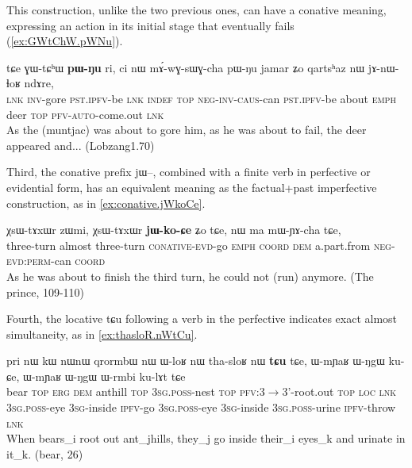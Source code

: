 \documentclass[oldfontcommands,oneside,a4paper,11pt]{article}
\newcommand{\ipa}[1]{{\phon \mbox{#1}}} %
\begin{document}
This construction, unlike the two previous ones, can have a conative meaning, expressing an action in its initial stage that eventually fails (\ref{ex:GWtChW.pWNu}).

     \begin{exe}
\ex \label{ex:GWtChW.pWNu}
\gll
\ipa{tɕe}  	\ipa{ɣɯ-tɕʰɯ}  	\ipa{\textbf{pɯ-ŋu}}  	\ipa{ri,}  	\ipa{ci}  	\ipa{nɯ}  	\ipa{mɤ́-wɣ-sɯɣ-cha}  	\ipa{pɯ-ŋu}  	\ipa{jamar}  	\ipa{ʑo}  	\ipa{qartsʰaz}  	\ipa{nɯ}  	\ipa{jɤ-nɯ-ɬoʁ}  	\ipa{ndɤre,}  \\
\textsc{lnk} \textsc{inv}-gore \textsc{pst.ipfv}-be \textsc{lnk} \textsc{indef} \textsc{top} \textsc{neg-inv-caus}-can  \textsc{pst.ipfv}-be about \textsc{emph} deer \textsc{top} \textsc{pfv-auto}-come.out \textsc{lnk} \\
\glt As the (muntjac) was about to gore him, as he was about to fail, the deer appeared and... (Lobzang1.70)
 \end{exe}

Third, the conative prefix \ipa{jɯ}--, combined with a finite verb  in perfective or evidential form, has an equivalent meaning as the factual+past imperfective construction, as in \ref{ex:conative.jWkoCe}.

\begin{exe}
\ex \label{ex:conative.jWkoCe}
\gll 
\ipa{χsɯ-tɤxɯr}   	\ipa{zɯmi,}   	\ipa{χsɯ-tɤxɯr}   	\ipa{\textbf{jɯ-ko-ɕe}}   	\ipa{ʑo}   	   	\ipa{tɕe,}   	\ipa{nɯ}   	\ipa{ma}   	\ipa{mɯ-ɲɤ-cha}   	\ipa{tɕe,}   \\
three-turn almost three-turn \textsc{conative-evd}-go \textsc{emph} \textsc{coord} \textsc{dem} a.part.from \textsc{neg-evd:perm}-can \textsc{coord} \\
\glt As he was about to finish the third turn, he could not (run) anymore. (The prince, 109-110)
\end{exe}


Fourth, the locative \ipa{tɕu} following a verb in the perfective indicates exact almost simultaneity, as in \ref{ex:thasloR.nWtCu}.  
\begin{exe}
\ex \label{ex:thasloR.nWtCu}
\gll
\ipa{pri}   	\ipa{nɯ}   	\ipa{kɯ}   	\ipa{nɯnɯ}   	\ipa{qrormbɯ}   	\ipa{nɯ}   	\ipa{ɯ-loʁ}   	\ipa{nɯ}   	\ipa{tha-sloʁ}   	\ipa{nɯ}   	\ipa{\textbf{tɕu}}   	\ipa{tɕe,}   	  	\ipa{ɯ-mɲaʁ}   	\ipa{ɯ-ŋgɯ}   	\ipa{ku-ɕe,}   	\ipa{ɯ-mɲaʁ}   	\ipa{ɯ-ŋgɯ}   	\ipa{ɯ-rmbi}   	\ipa{ku-lɤt}   	\ipa{tɕe}   	\\
bear \textsc{top} \textsc{erg} \textsc{dem} anthill \textsc{top} \textsc{3sg.poss}-nest \textsc{top} \textsc{pfv}:3$\rightarrow$3'-root.out \textsc{top} \textsc{loc} \textsc{lnk} \textsc{3sg.poss}-eye \textsc{3sg}-inside \textsc{ipfv}-go \textsc{3sg.poss}-eye \textsc{3sg}-inside \textsc{3sg.poss}-urine \textsc{ipfv}-throw \textsc{lnk} \\
\glt When bears_i root out ant_jhills, they_j go inside their_i eyes_k and urinate in it_k.
(bear, 26)
\end{exe}
\end{document}
